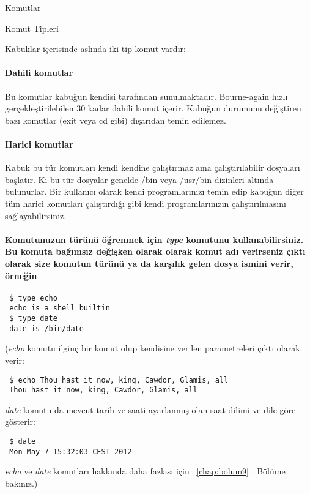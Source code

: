 \begin{section}{Komutlar}
\begin{subsection}{Komut Tipleri}

Kabuklar içerisinde aslında iki tip komut vardır:

\paragraph{Dahili komutlar}{Bu komutlar kabuğun kendisi tarafından sunulmaktadır. Bourne-again hızlı gerçekleştirilebilen 30 kadar dahili komut içerir. Kabuğun durumunu değiştiren bazı komutlar (exit veya cd gibi) dışarıdan temin edilemez.}
\paragraph{Harici komutlar}{Kabuk bu tür komutları kendi kendine çalıştırmaz ama çalıştırılabilir dosyaları başlatır. Ki bu tür dosyalar genelde /bin veya /usr/bin dizinleri altında bulunurlar. Bir kullanıcı olarak kendi programlarınızı temin edip kabuğun diğer tüm harici komutları çalıştırdığı gibi kendi programlarınızın çalıştırılmasını sağlayabilirsiniz.}
\paragraph{Komutunuzun türünü öğrenmek için \emph{type} komutunu kullanabilirsiniz. Bu komuta bağımsız değişken olarak olarak komut adı verirseniz çıktı olarak size komutun türünü ya da karşılık gelen dosya ismini verir, örneğin}
\footnotesize
\begin{verbatim}
 $ type echo
 echo is a shell builtin
 $ type date
 date is /bin/date
\end{verbatim}
 \normalsize 

(\emph{echo} komutu ilginç bir komut olup kendisine verilen parametreleri çıktı olarak verir:

\footnotesize
\begin{verbatim}
 $ echo Thou hast it now, king, Cawdor, Glamis, all
 Thou hast it now, king, Cawdor, Glamis, all
\end{verbatim}
 \normalsize 

\emph{date} komutu da mevcut tarih ve saati ayarlanmış olan saat dilimi ve dile göre gösterir:

\footnotesize
\begin{verbatim}
 $ date
 Mon May 7 15:32:03 CEST 2012
\end{verbatim}
 \normalsize 

\emph{echo} ve \emph{date} komutları hakkında daha fazlası için ~\ref{chap:bolum9} . Bölüme bakınız.)


\end{subsection}
\end{section}
